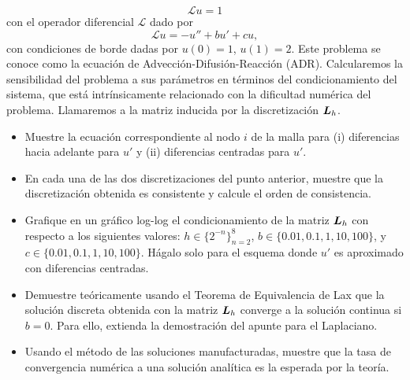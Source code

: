 \documentclass{article}
\newcommand{\mat}{\matrixsym}
\newcommand{\pts}[1]{[{\bf #1 puntos}] }
\begin{document}
\begin{enumerate}
            $$ \mathcal L u = 1 $$ 
            con el operador diferencial $\mathcal L$ dado por
            $$ \mathcal L u = - u'' + bu' + cu, $$
            con condiciones de borde dadas por $u(0) = 1$, $u(1) = 2$. Este problema se conoce como la ecuación de Advección-Difusión-Reacción (ADR).  Calcularemos la sensibilidad del problema a sus parámetros en términos del condicionamiento del sistema, que está intrínsicamente relacionado con la dificultad numérica del problema. Llamaremos a la matriz inducida por la discretización $\mat L_h$. 
            \begin{itemize}
                \item\pts{1} Muestre la ecuación correspondiente al nodo $i$ de la malla para (i) diferencias hacia adelante para $u'$ y (ii) diferencias centradas para $u'$. 
                \item\pts{2} En cada una de las dos discretizaciones del punto anterior, muestre que la discretización obtenida es consistente y calcule el orden de consistencia.
                \item\pts{1} Grafique en un gráfico log-log el condicionamiento de la matriz $\mat L_h$ con respecto a los siguientes valores: $h \in \{2^{-n}\}_{n=2}^8$, $b \in \{0.01,0.1,1,10,100\}$, y $c \in \{0.01,0.1,1,10,100\}$. Hágalo solo para el esquema donde $u'$ es aproximado con diferencias centradas.
                \item\pts{2} Demuestre teóricamente usando el Teorema de Equivalencia de Lax que la solución discreta obtenida con la matriz $\mat L_h$ converge a la solución continua si $b=0$. Para ello, extienda la demostración del apunte para el Laplaciano.
                \item\pts{2} Usando el método de las soluciones manufacturadas, muestre que la tasa de convergencia numérica a una solución analítica es la esperada por la teoría. 
            \end{itemize}

\end{enumerate}

\end{document}

